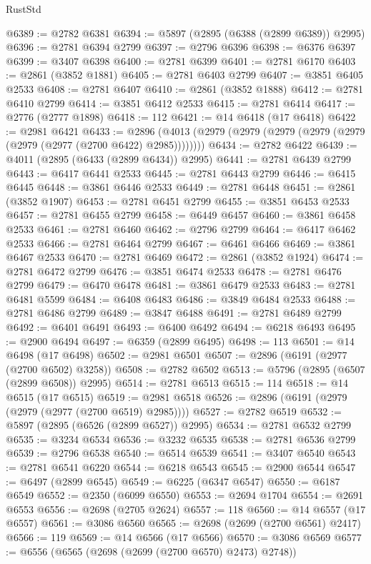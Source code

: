 \begin{lexlean}{RustStd}
\begin{coremodule}
@6389 := @2782 @6381
@6394 := @5897 (@2895 (@6388 (@2899 @6389)) @2995)
@6396 := @2781 @6394 @2799
@6397 := @2796 @6396
@6398 := @6376 @6397
@6399 := @3407 @6398
@6400 := @2781 @6399
@6401 := @2781 @6170
@6403 := @2861 (@3852 @1881)
@6405 := @2781 @6403 @2799
@6407 := @3851 @6405 @2533
@6408 := @2781 @6407
@6410 := @2861 (@3852 @1888)
@6412 := @2781 @6410 @2799
@6414 := @3851 @6412 @2533
@6415 := @2781 @6414
@6417 := @2776 (@2777 @1898)
@6418 := 112
@6421 := @14 @6418 (@17 @6418)
@6422 := @2981 @6421
@6433 := @2896 (@4013 (@2979 (@2979 (@2979 (@2979 (@2979 (@2979 (@2977 (@2700 @6422) @2985))))))))
@6434 := @2782 @6422
@6439 := @4011 (@2895 (@6433 (@2899 @6434)) @2995)
@6441 := @2781 @6439 @2799
@6443 := @6417 @6441 @2533
@6445 := @2781 @6443 @2799
@6446 := @6415 @6445
@6448 := @3861 @6446 @2533
@6449 := @2781 @6448
@6451 := @2861 (@3852 @1907)
@6453 := @2781 @6451 @2799
@6455 := @3851 @6453 @2533
@6457 := @2781 @6455 @2799
@6458 := @6449 @6457
@6460 := @3861 @6458 @2533
@6461 := @2781 @6460
@6462 := @2796 @2799
@6464 := @6417 @6462 @2533
@6466 := @2781 @6464 @2799
@6467 := @6461 @6466
@6469 := @3861 @6467 @2533
@6470 := @2781 @6469
@6472 := @2861 (@3852 @1924)
@6474 := @2781 @6472 @2799
@6476 := @3851 @6474 @2533
@6478 := @2781 @6476 @2799
@6479 := @6470 @6478
@6481 := @3861 @6479 @2533
@6483 := @2781 @6481 @5599
@6484 := @6408 @6483
@6486 := @3849 @6484 @2533
@6488 := @2781 @6486 @2799
@6489 := @3847 @6488
@6491 := @2781 @6489 @2799
@6492 := @6401 @6491
@6493 := @6400 @6492
@6494 := @6218 @6493
@6495 := @2900 @6494
@6497 := @6359 (@2899 @6495)
@6498 := 113
@6501 := @14 @6498 (@17 @6498)
@6502 := @2981 @6501
@6507 := @2896 (@6191 (@2977 (@2700 @6502) @3258))
@6508 := @2782 @6502
@6513 := @5796 (@2895 (@6507 (@2899 @6508)) @2995)
@6514 := @2781 @6513
@6515 := 114
@6518 := @14 @6515 (@17 @6515)
@6519 := @2981 @6518
@6526 := @2896 (@6191 (@2979 (@2979 (@2977 (@2700 @6519) @2985))))
@6527 := @2782 @6519
@6532 := @5897 (@2895 (@6526 (@2899 @6527)) @2995)
@6534 := @2781 @6532 @2799
@6535 := @3234 @6534
@6536 := @3232 @6535
@6538 := @2781 @6536 @2799
@6539 := @2796 @6538
@6540 := @6514 @6539
@6541 := @3407 @6540
@6543 := @2781 @6541 @6220
@6544 := @6218 @6543
@6545 := @2900 @6544
@6547 := @6497 (@2899 @6545)
@6549 := @6225 (@6347 @6547)
@6550 := @6187 @6549
@6552 := @2350 (@6099 @6550)
@6553 := @2694 @1704
@6554 := @2691 @6553
@6556 := @2698 (@2705 @2624)
@6557 := 118
@6560 := @14 @6557 (@17 @6557)
@6561 := @3086 @6560
@6565 := @2698 (@2699 (@2700 @6561) @2417)
@6566 := 119
@6569 := @14 @6566 (@17 @6566)
@6570 := @3086 @6569
@6577 := @6556 (@6565 (@2698 (@2699 (@2700 @6570) @2473) @2748))

\end{coremodule}
\end{lexlean}
